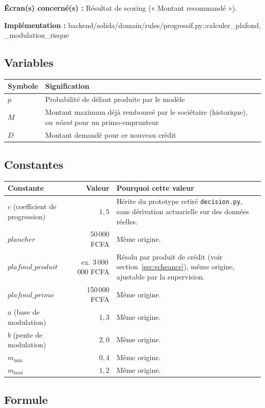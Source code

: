 \documentclass[11pt,a4paper]{article}
\newcommand{\brk}{\allowbreak}
\newcommand{\ecran}[1]{\noindent\textbf{Écran(s) concerné(s) :} #1\par}
\newcommand{\fichier}[1]{\noindent\textbf{Implémentation :} \tiny\ttfamily#1\normalfont\normalsize\par}
\begin{document}
\ecran{Résultat de scoring (« Montant recommandé »).}
\fichier{backend/\brk solida/\brk domain/\brk rules/\brk progressif.py::\brk{}calculer\_plafond, \_modulation\_risque}

\subsection*{Variables}

\begin{tabular}{@{}lL{9.5cm}@{}}
\toprule
Symbole & Signification \\
\midrule
$p$ & Probabilité de défaut produite par le modèle \\
$M$ & Montant maximum déjà remboursé par le sociétaire (historique), ou \emph{néant} pour un
  primo-emprunteur \\
$D$ & Montant demandé pour ce nouveau crédit \\
\bottomrule
\end{tabular}

\subsection*{Constantes}

\begin{tabular}{@{}L{3.2cm}rL{6.5cm}@{}}
\toprule
Constante & Valeur & Pourquoi cette valeur \\
\midrule
$c$ (coefficient de progression) & $1{,}5$ & Hérite du prototype retiré \texttt{decision.py}, sans
  dérivation actuarielle sur des données réelles. \\
$\mathit{plancher}$ & 50\,000 FCFA & Même origine. \\
$\mathit{plafond\_produit}$ & ex. 3\,000\,000 FCFA & Résolu par produit de crédit (voir
  section~\ref{sec:echeance}), même origine, ajustable par la supervision. \\
$\mathit{plafond\_primo}$ & 150\,000 FCFA & Même origine. \\
$a$ (base de modulation) & $1{,}3$ & Même origine. \\
$b$ (pente de modulation) & $2{,}0$ & Même origine. \\
$m_{\min}$ & $0{,}4$ & Même origine. \\
$m_{\max}$ & $1{,}2$ & Même origine. \\
\bottomrule
\end{tabular}

\subsection*{Formule}
\end{document}
